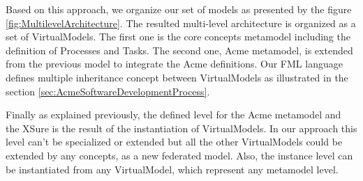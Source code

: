 Based on this approach, we organize our set of models as presented by the figure \ref{fig:MultilevelArchitecture}. The resulted multi-level architecture is organized as a set of VirtualModels. The first one is the core concepts metamodel including the definition of Processes and Tasks. The second one, Acme metamodel, is extended from the previous model to integrate the Acme definitions. Our FML language defines multiple inheritance concept between VirtualModels as illustrated in the section \ref{sec:AcmeSoftwareDevelopmentProcess}.

Finally as explained previously, the defined level for the Acme metamodel and the XSure is the result of the instantiation of VirtualModels. In our approach this level can't be specialized or extended but all the other VirtualModels could be extended  by any concepts, as a new federated model. 
Also, the instance level can be instantiated from any VirtualModel, which represent any metamodel level. 






~\\
~\\



